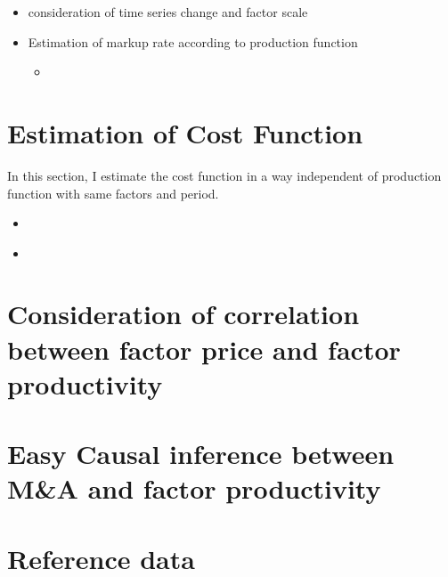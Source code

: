 \documentclass[dvipdfmx,uplatex]{jsarticle}
\begin{document}
\begin{itemize}
\begin{itemize}
          \end{itemize}
    \item consideration of time series change and factor scale
    \item Estimation of markup rate according to production function
          \begin{itemize}[label=$\blacktriangleright$]
              \item \href{https://repository.tku.ac.jp/dspace/bitstream/11150/11249/1/keizai299-11.pdf}{}
          \end{itemize}
\end{itemize}




\section{Estimation of Cost Function}
In this section, I estimate the cost function in a way independent of production function with same factors and period.\\
\begin{itemize}[label=$\blacktriangleright$]
    \item \href{https://doshisha.repo.nii.ac.jp/?action=repository_action_common_download&item_id=22965&item_no=1&attribute_id=28&file_no=1}{}
    \item \href{https://core.ac.uk/download/pdf/71796667.pdf}{}
\end{itemize}






\section{Consideration of correlation between factor price and factor productivity}





\section{Easy Causal inference between M\&A and factor productivity}






\section{Reference data}
\end{document}
